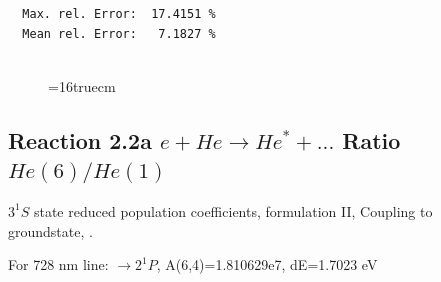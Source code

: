 \documentclass[12pt,dvips]{article}
\begin{document}
\begin{small}
\begin{verbatim}
  Max. rel. Error:  17.4151 %
  Mean rel. Error:   7.1827 %


\end{verbatim}\end{small}
\begin{figure} \label{2.1.8lr2o}
\epsfxsize=16truecm
\end{figure}
\newpage



\subsection{
  Reaction 2.2a $e + He \rightarrow He^* + ... $ Ratio $He(6)/He(1)$
}

  $3^1S$ state
  reduced population coefficients, formulation II,
  Coupling to groundstate, \cite{kn:Fujimoto}.

  For 728 nm line:  $\rightarrow 2^1P$, A(6,4)=1.810629e7, dE=1.7023 eV
\end{document}
